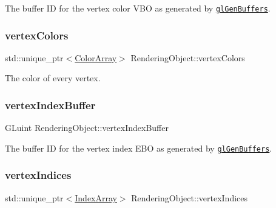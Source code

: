 The buffer ID for the vertex color V\+BO as generated by \href{https://www.opengl.org/sdk/docs/man/html/glGenBuffers.xhtml}{\tt gl\+Gen\+Buffers}. 

\hypertarget{class_rendering_object_a65fc52e665791ce55e43106b603e917a}{}\label{class_rendering_object_a65fc52e665791ce55e43106b603e917a} 
\subsubsection{\texorpdfstring{vertex\+Colors}{vertexColors}}
{\footnotesize\ttfamily std\+::unique\+\_\+ptr$<$\hyperlink{class_rendering_object_a8a12e1f9be788d99af6c089e1c600022}{Color\+Array}$>$ Rendering\+Object\+::vertex\+Colors\hspace{0.3cm}{\ttfamily [protected]}}



The color of every vertex. 

\hypertarget{class_rendering_object_a6740a0a0e6bd4d841c9c211f2a31cca3}{}\label{class_rendering_object_a6740a0a0e6bd4d841c9c211f2a31cca3} 
\subsubsection{\texorpdfstring{vertex\+Index\+Buffer}{vertexIndexBuffer}}
{\footnotesize\ttfamily G\+Luint Rendering\+Object\+::vertex\+Index\+Buffer\hspace{0.3cm}{\ttfamily [protected]}}



The buffer ID for the vertex index E\+BO as generated by \href{https://www.opengl.org/sdk/docs/man/html/glGenBuffers.xhtml}{\tt gl\+Gen\+Buffers}. 

\hypertarget{class_rendering_object_a7b84487d3c34c1ca36b2ac6060b0f802}{}\label{class_rendering_object_a7b84487d3c34c1ca36b2ac6060b0f802} 
\subsubsection{\texorpdfstring{vertex\+Indices}{vertexIndices}}
{\footnotesize\ttfamily std\+::unique\+\_\+ptr$<$\hyperlink{class_rendering_object_a9931c88bca3384065c6691dfe1e60af1}{Index\+Array}$>$ Rendering\+Object\+::vertex\+Indices\hspace{0.3cm}{\ttfamily [protected]}}



